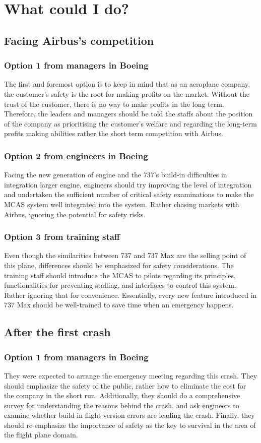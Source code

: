 \documentclass{article}
\begin{document}
\section{What could I do?}
\subsection{Facing Airbus's competition}

\subsubsection{Option 1 from managers in Boeing}
The first and foremost option is to keep in mind that as an aeroplane company, the customer's safety is the root for making profits on the market. Without the trust of the customer, there is no way to make profits in the long term. Therefore, the leaders and managers should be told the staffs about the position of the company as prioritising the customer's welfare and regarding the long-term profits making abilities rather the short term competition with Airbus.
\subsubsection{Option 2 from engineers in Boeing}
Facing the new generation of engine and the 737's build-in difficulties in integration larger engine, engineers should try improving the level of integration and undertaken the sufficient number of critical safety examinations to make the MCAS system well integrated into the system. Rather chasing markets with Airbus, ignoring the potential for safety risks.
\subsubsection{Option 3 from training staff}
Even though the similarities between 737 and 737 Max are the selling point of this plane, differences should be emphasized for safety considerations. The training staff should introduce the MCAS to pilots regarding its principles, functionalities for preventing stalling, and interfaces to control this system. Rather ignoring that for convenience. Essentially, every new feature introduced in 737 Max should be well-trained to save time when an emergency happens. 
\subsection{After the first crash}
\subsubsection{Option 1 from managers in Boeing}
They were expected to arrange the emergency meeting regarding this crash. They should emphasize the safety of the public, rather how to eliminate the cost for the company in the short run. Additionally, they should do a comprehensive survey for understanding the reasons behind the crash, and ask engineers to examine whether build-in flight version errors are leading the crash. Finally, they should re-emphasize the importance of safety as the key to survival in the area of the flight plane domain.
\end{document}
